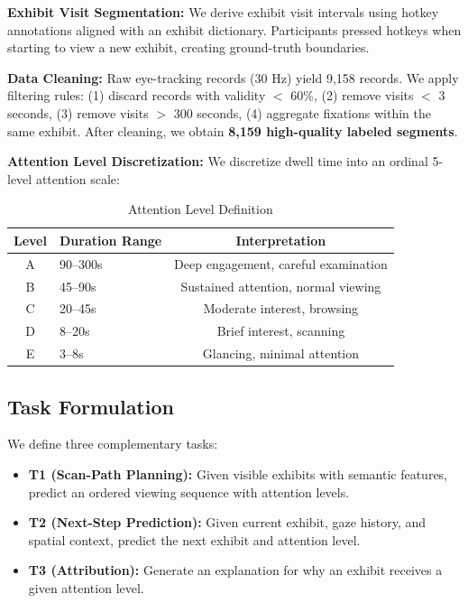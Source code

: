 \documentclass{article}
\begin{document}
\textbf{Exhibit Visit Segmentation:} We derive exhibit visit intervals using hotkey annotations aligned with an exhibit dictionary. Participants pressed hotkeys when starting to view a new exhibit, creating ground-truth boundaries.

\textbf{Data Cleaning:} Raw eye-tracking records (30 Hz) yield 9,158 records. We apply filtering rules: (1) discard records with validity $<$ 60\%, (2) remove visits $<$ 3 seconds, (3) remove visits $>$ 300 seconds, (4) aggregate fixations within the same exhibit. After cleaning, we obtain \textbf{8,159 high-quality labeled segments}.

\textbf{Attention Level Discretization:} We discretize dwell time into an ordinal 5-level attention scale:

\begin{table}[h]
\centering
\caption{Attention Level Definition}
\begin{tabular}{clc}
\toprule
Level & Duration Range & Interpretation \\
\midrule
A & 90--300s & Deep engagement, careful examination \\
B & 45--90s & Sustained attention, normal viewing \\
C & 20--45s & Moderate interest, browsing \\
D & 8--20s & Brief interest, scanning \\
E & 3--8s & Glancing, minimal attention \\
\bottomrule
\end{tabular}
\end{table}

\subsection{Task Formulation}

We define three complementary tasks:

\begin{itemize}
    \item \textbf{T1 (Scan-Path Planning):} Given visible exhibits with semantic features, predict an ordered viewing sequence with attention levels.
    \item \textbf{T2 (Next-Step Prediction):} Given current exhibit, gaze history, and spatial context, predict the next exhibit and attention level.
    \item \textbf{T3 (Attribution):} Generate an explanation for why an exhibit receives a given attention level.
\end{itemize}
\end{document}
